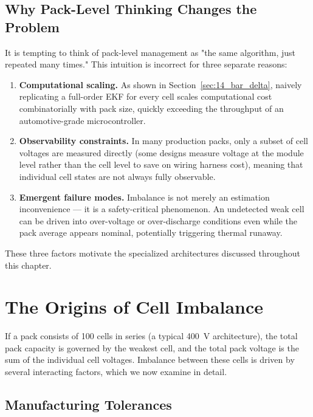 \subsection{Why Pack-Level Thinking Changes the Problem}
\label{subsec:14_why_pack}

It is tempting to think of pack-level management as "the same algorithm, just repeated many times." This intuition is incorrect for three separate reasons:

\begin{enumerate}
    \item \textbf{Computational scaling.} As shown in Section~\ref{sec:14_bar_delta}, naively replicating a full-order EKF for every cell scales computational cost combinatorially with pack size, quickly exceeding the throughput of an automotive-grade microcontroller.
    \item \textbf{Observability constraints.} In many production packs, only a subset of cell voltages are measured directly (some designs measure voltage at the module level rather than the cell level to save on wiring harness cost), meaning that individual cell states are not always fully observable.
    \item \textbf{Emergent failure modes.} Imbalance is not merely an estimation inconvenience — it is a safety-critical phenomenon. An undetected weak cell can be driven into over-voltage or over-discharge conditions even while the pack average appears nominal, potentially triggering thermal runaway.
\end{enumerate}

These three factors motivate the specialized architectures discussed throughout this chapter.

\section{The Origins of Cell Imbalance}
\label{sec:14_imbalance}

If a pack consists of 100 cells in series (a typical 400~V architecture), the total pack capacity is governed by the weakest cell, and the total pack voltage is the sum of the individual cell voltages. Imbalance between these cells is driven by several interacting factors, which we now examine in detail.

\subsection{Manufacturing Tolerances}
\label{subsec:14_manufacturing}

